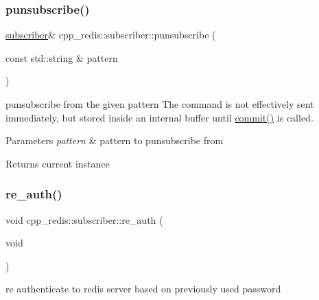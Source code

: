 \subsubsection{\texorpdfstring{punsubscribe()}{punsubscribe()}}
{\footnotesize\ttfamily \hyperlink{classcpp__redis_1_1subscriber}{subscriber}\& cpp\+\_\+redis\+::subscriber\+::punsubscribe (\begin{DoxyParamCaption}\item[{const std\+::string \&}]{pattern }\end{DoxyParamCaption})}

punsubscribe from the given pattern The command is not effectively sent immediately, but stored inside an internal buffer until \hyperlink{classcpp__redis_1_1subscriber_abbf600802ed93b82323185eec5719ecb}{commit()} is called.


\begin{DoxyParams}{Parameters}
{\em pattern} & pattern to punsubscribe from \\
\hline
\end{DoxyParams}
\begin{DoxyReturn}{Returns}
current instance 
\end{DoxyReturn}
\mbox{\label{classcpp__redis_1_1subscriber_acb33b48b9dfa03b4a5b60cc832b57259}} 
\subsubsection{\texorpdfstring{re\+\_\+auth()}{re\_auth()}}
{\footnotesize\ttfamily void cpp\+\_\+redis\+::subscriber\+::re\+\_\+auth (\begin{DoxyParamCaption}\item[{void}]{ }\end{DoxyParamCaption})\hspace{0.3cm}{\ttfamily [private]}}

re authenticate to redis server based on previously used password \mbox{\label{classcpp__redis_1_1subscriber_ac38ffc11fb8e67159a7ffa924a6bb8a6}} 
